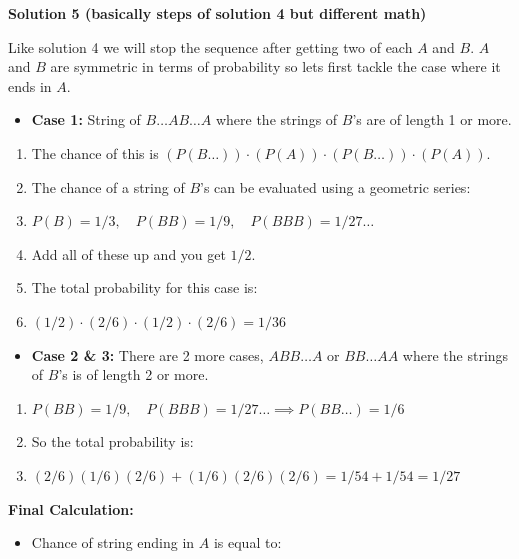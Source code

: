 \begin{enumerate}
 



\textbf{Solution 5 (basically steps of solution 4 but different math)}

Like solution 4 we will stop the sequence after getting two of each $A$ and $B$. $A$ and $B$ are symmetric in terms of probability so lets first tackle the case where it ends in $A$.

 
            \begin{itemize}
        \item \textbf{Case 1:} String of $B \dots A B \dots A$ where the strings of $B$'s are of length 1 or more.
            \end{itemize}
            
            \begin{enumerate}[label=(\roman*)]
                \item The chance of this is $(P(B \dots)) \cdot (P(A)) \cdot (P(B \dots)) \cdot (P(A))$.\item The chance of a string of $B$'s can be evaluated using a geometric series:\item $P(B) = 1/3, \quad P(BB) = 1/9, \quad P(BBB) = 1/27 \dots$\item Add all of these up and you get $1/2$.\item The total probability for this case is:\item $(1/2) \cdot (2/6) \cdot (1/2) \cdot (2/6) = 1/36$
            \end{enumerate}
            
            \begin{itemize}
        \item \textbf{Case 2 & 3:} There are 2 more cases, $ABB \dots A$ or $BB \dots AA$ where the strings of $B$'s is of length 2 or more.
            \end{itemize}
            
            \begin{enumerate}[label=(\roman*)]
                \item $P(BB) = 1/9, \quad P(BBB) = 1/27 \dots \implies P(BB \dots) = 1/6$\item So the total probability is:\item $(2/6)(1/6)(2/6) + (1/6)(2/6)(2/6) = 1/54 + 1/54 = 1/27$
            \end{enumerate}
            \textbf{Final Calculation:}

 
            \begin{itemize}
        \item Chance of string ending in $A$ is equal to:
            \end{itemize}
            

\end{enumerate}
